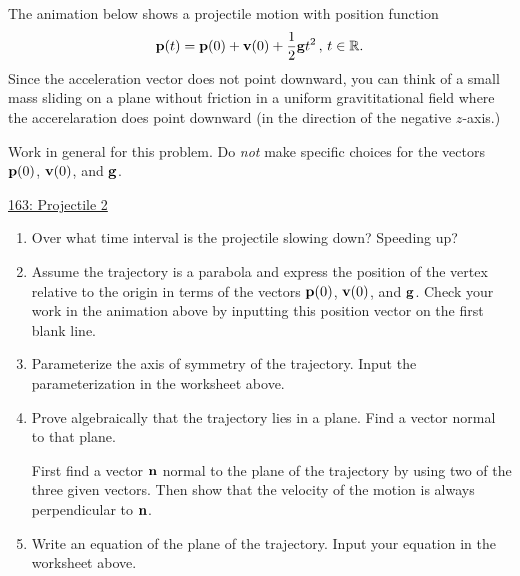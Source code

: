 \documentclass{ximera}
\begin{document}
\begin{question}  \label{Q454rft4t4t}
The animation below shows a projectile motion with position function
\[
    {\bf p}(t) = {\bf p}(0) + {\bf v}(0) + \frac{1}{2}{\bf g}t^2 \, , \, t \in \mathbb{R} .
\]
Since the acceleration vector does not point downward, you can think of a small mass sliding on a plane without friction in a uniform gravititational field where the accerelaration does point downward (in the direction of the negative $z$-axis.)

Work in general for this problem. Do \emph{not} make specific choices for the vectors ${\bf p}(0)$, ${\bf v}(0)$, and ${\bf g}$. 

\begin{onlineOnly}
    \begin{center}
\end{center}
\end{onlineOnly}

\href{https://www.desmos.com/3d/clr4mdmltt}{163: Projectile 2}

\begin{enumerate}
\item Over what time interval is the projectile slowing down? Speeding up?

\item Assume the trajectory is a parabola and express the position of the vertex relative to the origin in terms of the vectors ${\bf p}(0)$, ${\bf v}(0)$, and ${\bf g}$. Check  your work in the animation above by inputting this position vector on the first blank line.

\item Parameterize the axis of symmetry of the trajectory. Input the parameterization in the worksheet above.

\item Prove algebraically that the trajectory lies in a plane. Find a vector normal to that plane.

\begin{hint}
First find a vector ${\bf n}$ normal to the plane of the trajectory by using two of the three given vectors. Then show that the velocity of the motion is always perpendicular to ${\bf n}$.
\end{hint}


\item Write an equation of the plane of the trajectory. Input your equation in the worksheet above.

\end{enumerate}


\end{question}
\end{document}
